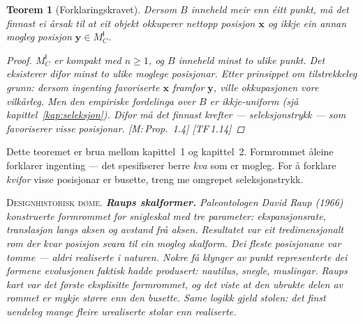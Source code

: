 \documentclass[10pt]{book}
\theoremstyle{definition}
\theoremstyle{plain}
\newtheorem{teorem}[definisjon]{Teorem}
\theoremstyle{remark}
\newenvironment{designhistorie}%
  {\medskip\noindent\textsc{Designhistorisk d\o me.}\itshape\enspace}%
  {\medskip}
\newcommand{\MC}{M^{\mathsf{I}}_C}
\newcommand{\TF}[1]{\textnormal{[TF\,#1]}}
\newcommand{\Mref}[1]{\textnormal{[M:\,#1]}}
\begin{document}
\begin{teorem}[Forklaringskravet]\label{thm:forklaring}
Dersom $B$ inneheld meir enn \'eitt punkt, m\aa{} det finnast ei \aa rsak til at eit objekt okkuperer nettopp posisjon $\bm{x}$ og ikkje ein annan mogleg posisjon $\bm{y} \in \MC$.

\begin{proof}
$\MC$ er kompakt med $n \geq 1$, og $B$ inneheld minst to ulike punkt. Det eksisterer difor minst to ulike moglege posisjonar. Etter prinsippet om tilstrekkeleg grunn: dersom ingenting favoriserte $\bm{x}$ framfor $\bm{y}$, ville okkupasjonen vore vilk\aa rleg. Men den empiriske fordelinga over $B$ er ikkje-uniform (sj\aa{} kapittel~\ref{kap:seleksjon}). Difor m\aa{} det finnast krefter --- \emph{seleksjonstrykk} --- som favoriserer visse posisjonar. \Mref{Prop.~1.4} \TF{1.14}
\end{proof}
\end{teorem}

Dette teoremet er brua mellom kapittel~1 og kapittel~2. Formrommet \aa leine forklarer ingenting --- det spesifiserer berre \emph{kva} som er mogleg. For \aa{} forklare \emph{kvifor} visse posisjonar er busette, treng me omgrepet seleksjonstrykk.

\begin{designhistorie}
\textbf{Raups skalformer.} Paleontologen David Raup (1966) konstruerte formrommet for snigleskal med tre parameter: ekspansjonsrate, translasjon langs aksen og avstand fr\aa{} aksen. Resultatet var eit tredimensjonalt rom der kvar posisjon svara til ein mogleg skalform. Dei fleste posisjonane var tomme --- aldri realiserte i naturen. Nokre f\aa{} klynger av punkt representerte dei formene evolusjonen faktisk hadde produsert: nautilus, snegle, muslingar. Raups kart var det f\o rste eksplisitte formrommet, og det viste at den ubrukte delen av rommet er mykje st\o rre enn den busette. Same logikk gjeld stolen: det finst uendeleg mange fleire urealiserte stolar enn realiserte.
\end{designhistorie}
\end{document}
